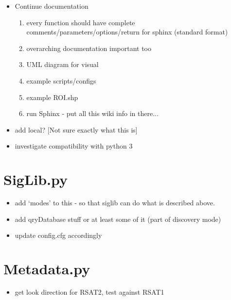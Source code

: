 \documentclass[letterpaper,10pt,english]{sphinxmanual}
\begin{document}
\begin{itemize}
\item {} 
Continue documentation
\begin{enumerate}
\item {} 
every function should have complete
comments/parameters/options/return for sphinx (standard format)

\item {} 
overarching documentation important too

\item {} 
UML diagram for visual

\item {} 
example scripts/configs

\item {} 
example ROI.shp

\item {} 
run Sphinx - put all this wiki info in there...

\end{enumerate}

\item {} 
add local? {[}Not sure exactly what this is{]}

\item {} 
investigate compatibility with python 3

\end{itemize}


\section{SigLib.py}
\label{todo:siglib-py}\begin{itemize}
\item {} 
add `modes' to this - so that siglib can do what is described above.

\item {} 
add qryDatabase stuff or at least some of it (part of discovery mode)

\item {} 
update config.cfg accordingly

\end{itemize}


\section{Metadata.py}
\label{todo:metadata-py}\begin{itemize}
\item {} 
get look direction for RSAT2, test against RSAT1

\end{itemize}
\end{document}
